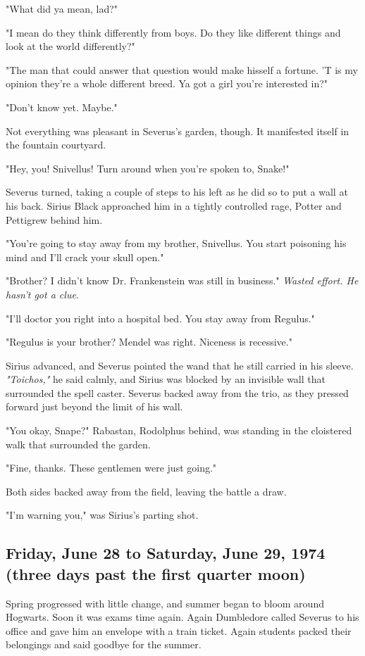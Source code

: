 \documentclass[a4paper,11pt]{article}
\begin{document}
"What did ya mean, lad?"

"I mean do they think differently from boys. Do they like different things and look at the world differently?"

"The man that could answer that question would make hisself a fortune. 'T is my opinion they're a whole different breed. Ya got a girl you're interested in?"

"Don't know yet. Maybe."

Not everything was pleasant in Severus's garden, though. It manifested itself in the fountain courtyard.

"Hey, you! Snivellus! Turn around when you're spoken to, Snake!"

Severus turned, taking a couple of steps to his left as he did so to put a wall at his back. Sirius Black approached him in a tightly controlled rage, Potter and Pettigrew behind him.

"You're going to stay away from my brother, Snivellus. You start poisoning his mind and I'll crack your skull open."

"Brother? I didn't know Dr. Frankenstein was still in business." \emph{Wasted effort. He hasn't got a clue.}

"I'll doctor you right into a hospital bed. You stay away from Regulus."

"Regulus is your brother? Mendel was right. Niceness is recessive."

Sirius advanced, and Severus pointed the wand that he still carried in his sleeve. \emph{"Toichos,"} he said calmly, and Sirius was blocked by an invisible wall that surrounded the spell caster. Severus backed away from the trio, as they pressed forward just beyond the limit of his wall.

"You okay, Snape?" Rabastan, Rodolphus behind, was standing in the cloistered walk that surrounded the garden.

"Fine, thanks. These gentlemen were just going."

Both sides backed away from the field, leaving the battle a draw.

"I'm warning you," was Sirius's parting shot.

\subsection{Friday, June 28 to Saturday, June 29, 1974 (three days past the first quarter moon)}

Spring progressed with little change, and summer began to bloom around Hogwarts. Soon it was exams time again. Again Dumbledore called Severus to his office and gave him an envelope with a train ticket. Again students packed their belongings and said goodbye for the summer.
\end{document}
